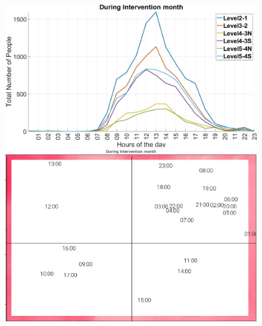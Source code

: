 \begin{figure}[htb]
    \begin{minipage}[b]{0.5\textwidth}
    \includegraphics[width=\textwidth]{image/Chapters/Chapter6/during_int.jpg}%
    \end{minipage}
    \begin{minipage}[b]{0.39\textwidth}
    \includegraphics[width=\textwidth]{image/Chapters/Chapter6/timeseriesDuring.png}
    \end{minipage}
    

\end{figure}
